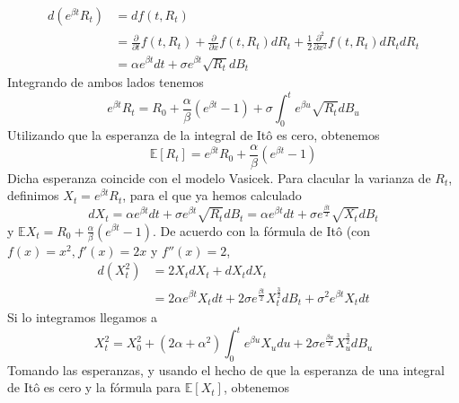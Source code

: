 \documentclass[11pt,notitlepage]{article}
\begin{document}
\begin{align*}
    d(e^{\beta t}R_t)&=df(t,R_t)\\
    &=\frac{\partial}{\partial t}f(t,R_t)+\frac{\partial}{\partial x}f(t,R_t)dR_t+\frac{1}{2}\frac{\partial^2}{\partial x^2}f(t,R_t)dR_t dR_t\\
    &= \alpha e^{\beta t} dt + \sigma e^{\beta t}\sqrt{R_t}dB_t
\end{align*}
Integrando de ambos lados tenemos
\begin{equation*}
    e^{\beta t}R_t=R_{0}+ \frac{\alpha}{\beta} (e^{\beta t}-1)+ \sigma \int_{0}^{t} e^{\beta u}\sqrt{R_t}dB_{u}
\end{equation*}
Utilizando que la esperanza de la integral de Itô es cero, obtenemos
\begin{equation}
    \mathbb{E}[R_{t}]=e^{\beta t}R_0 + \frac{\alpha}{\beta} (e^{\beta t}-1)
\end{equation}
Dicha esperanza coincide con el modelo Vasicek. Para clacular la varianza de $R_t$, definimos $X_t= e^{\beta t} R_t$, para el que ya hemos calculado 
\begin{equation*}
    dX_t=\alpha e^{\beta t} dt + \sigma e^{\beta t}\sqrt{R_t}dB_{t}=\alpha e^{\beta t} dt + \sigma e^{\frac{\beta t}{2}} \sqrt{X_t}dB_t
\end{equation*}
y $\mathbb{E}X_t=R_0+\frac{\alpha}{\beta} (e^{\beta t}-1)$. De acuerdo con la fórmula de Itô (con $f(x)=x^2, f'(x)=2x$ y $f''(x)=2$, 
\begin{align*}
    d(X^2_{t})&=2X_{t}dX_t+dX_{t}dX_{t}\\
    &=2\alpha e^{\beta t}X_{t}dt+2\sigma e^{\frac{\beta t}{2}} X^{\frac{3}{2}}_{t}dB_{t}+ \sigma^2 e^{\beta t} X_{t}dt 
\end{align*}
Si lo integramos llegamos a
\begin{equation*}
    X^2_{t}= X_{0}^{2}+(2\alpha+\alpha^2) \int_{0}^{t}e^{\beta u}X_{u}du+2\sigma e^{\frac{\beta u}{2}} X^{\frac{3}{2}}_{u}dB_u
\end{equation*}
Tomando las esperanzas, y usando el hecho de que la esperanza de una integral de Itô es cero y la fórmula para $ \mathbb{E}[X_t]$, obtenemos
\end{document}
